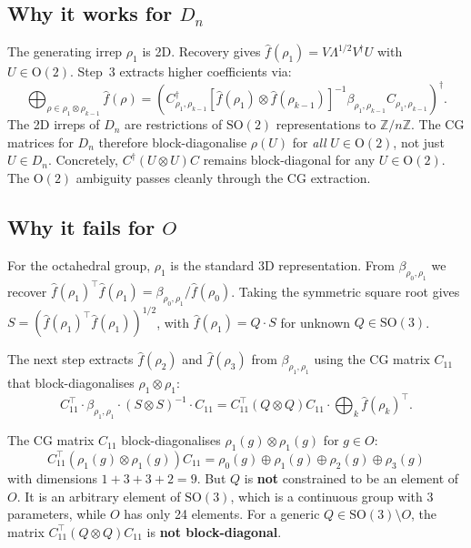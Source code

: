 \documentclass{article}
\newcommand{\SO}{\mathrm{SO}}
\newcommand{\OG}{\mathrm{O}}
\begin{document}
\subsection{Why it works for $D_n$}

The generating irrep $\rho_1$ is 2D. Recovery gives
$\hat{f}(\rho_1) = V\Lambda^{1/2}V^\dagger U$ with
$U \in \OG(2)$. Step~3 extracts higher coefficients via:
\[
  \bigoplus_{\rho \in \rho_1 \otimes \rho_{k-1}} \hat{f}(\rho)
  = \left(C_{\rho_1,\rho_{k-1}}^\dagger
    \left[\hat{f}(\rho_1) \otimes \hat{f}(\rho_{k-1})\right]^{-1}
    \beta_{\rho_1,\rho_{k-1}}
    C_{\rho_1,\rho_{k-1}}\right)^\dagger.
\]
The 2D irreps of $D_n$ are restrictions of $\SO(2)$ representations
to $\mathbb{Z}/n\mathbb{Z}$. The CG matrices for $D_n$ therefore
block-diagonalise $\rho(U)$ for \emph{all} $U \in \OG(2)$, not just
$U \in D_n$. Concretely, $C^\dagger(U \otimes U)C$ remains
block-diagonal for any $U \in \OG(2)$. The $\OG(2)$ ambiguity passes
cleanly through the CG extraction.

\subsection{Why it fails for $O$}

For the octahedral group, $\rho_1$ is the standard 3D representation.
From $\beta_{\rho_0, \rho_1}$ we recover
$\hat{f}(\rho_1)^\top \hat{f}(\rho_1) =
\beta_{\rho_0,\rho_1}/\hat{f}(\rho_0)$.
Taking the symmetric square root gives
$S = (\hat{f}(\rho_1)^\top \hat{f}(\rho_1))^{1/2}$, with
$\hat{f}(\rho_1) = Q \cdot S$ for unknown $Q \in \SO(3)$.

The next step extracts $\hat{f}(\rho_2)$ and $\hat{f}(\rho_3)$
from $\beta_{\rho_1, \rho_1}$ using the CG matrix $C_{11}$ that
block-diagonalises $\rho_1 \otimes \rho_1$:
\[
  C_{11}^\top \cdot \beta_{\rho_1,\rho_1} \cdot (S \otimes S)^{-1}
  \cdot C_{11}
  = C_{11}^\top (Q \otimes Q) C_{11}
  \cdot \bigoplus_k \hat{f}(\rho_k)^\top.
\]

The CG matrix $C_{11}$ block-diagonalises
$\rho_1(g) \otimes \rho_1(g)$ for $g \in O$:
\[
  C_{11}^\top (\rho_1(g) \otimes \rho_1(g)) C_{11}
  = \rho_0(g) \oplus \rho_1(g) \oplus \rho_2(g) \oplus \rho_3(g)
\]
with dimensions $1 + 3 + 3 + 2 = 9$. But $Q$ is \textbf{not}
constrained to be an element of $O$. It is an arbitrary element of
$\SO(3)$, which is a continuous group with 3 parameters, while $O$ has
only 24 elements. For a generic $Q \in \SO(3) \setminus O$, the matrix
$C_{11}^\top (Q \otimes Q) C_{11}$ is \textbf{not block-diagonal}.
\end{document}
